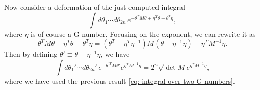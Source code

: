 Now consider a deformation of the just computed integral 
\begin{equation}
    \int d\theta_1\cdots d\theta_{2n}\,e^{-\theta^TM\theta + \eta^T\theta + \theta^T\eta},
\end{equation}
where $\eta$ is of course a G-number. Focusing on the exponent, we can rewrite it as 
\begin{equation}
    \theta^TM\theta - \eta^T\theta - \theta^T\eta = (\theta^T - \eta^T\eta^{-1})M(\theta - \eta^{-1}\eta) - \eta^TM^{-1}\eta.
\end{equation}
Then by defining $\theta' \equiv \theta - \eta^{-1}\eta$, we have 
\begin{equation}
    \int d\theta_1'\cdots d\theta_{2n}'\,e^{-\theta^{\prime T}M\theta'}e^{\eta^TM^{-1}\eta} = 2^n\sqrt{\det{M}}e^{\eta^TM^{-1}\eta},
\end{equation}
where we have used the previous result \eqref{eq: integral over two G-numbers}. 

